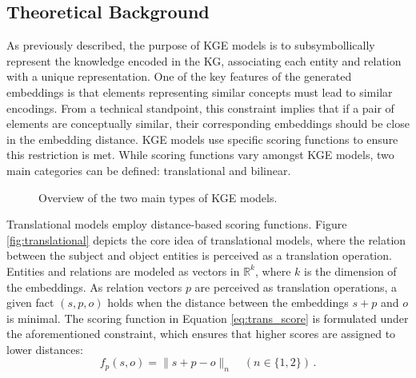 \subsection{Theoretical Background} \label{subsec:s4_theoretical_back}
As previously described, the purpose of KGE models is to subsymbollically represent the knowledge encoded in the KG, associating each entity and relation with a unique representation. One of the key features of the generated embeddings is that elements representing similar concepts must lead to similar encodings. From a technical standpoint, this constraint implies that if a pair of elements are conceptually similar, their corresponding embeddings should be close in the embedding distance. KGE models use specific scoring functions to ensure this restriction is met. While scoring functions vary amongst KGE models, two main categories can be defined: translational and bilinear. 

\begin{figure}[t!]
    \centering
    \qquad
    \caption{Overview of the two main types of KGE models.}
    \label{fig:kge_overview}
\end{figure}

Translational models employ distance-based scoring functions. Figure \ref{fig:translational} depicts the core idea of translational models, where the relation between the subject and object entities is perceived as a translation operation. Entities and relations are modeled as vectors in ${\mathbb{R}}^{k}$, where $k$ is the dimension of the embeddings. As relation vectors $p$ are perceived as translation operations, a given fact $(s,p,o)$ holds when the distance between the embeddings $s+p$ and $o$ is minimal. The scoring function in Equation \ref{eq:trans_score} is formulated under the aforementioned constraint, which ensures that higher scores are assigned to lower distances:
\begin{equation}\label{eq:trans_score}
    f_p(s,o)=\|s + p - o\|_n
    \quad
    ( n \in \{1,2\})\,.
\end{equation} 

